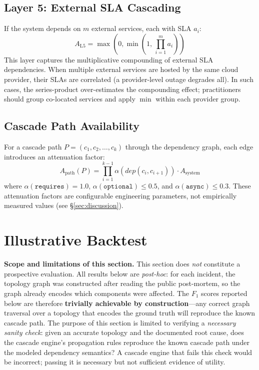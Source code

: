 \documentclass[10pt,twocolumn]{article}
\begin{document}
\subsection{Layer 5: External SLA Cascading}
If the system depends on $m$ external services, each with SLA $a_i$:
\begin{equation}
  A_{\text{L5}} = \max\!\left(0, \min\!\left(1,\,\prod_{i=1}^{m} a_i\right)\right)
\end{equation}
This layer captures the multiplicative compounding of external SLA
dependencies.
When multiple external services are hosted by the same cloud
provider, their SLAs are correlated (a provider-level outage
degrades all). In such cases, the series-product over-estimates
the compounding effect; practitioners should group co-located
services and apply $\min$ within each provider group.

\subsection{Cascade Path Availability}
For a cascade path $P = (c_1, c_2, \ldots, c_k)$ through the
dependency graph, each edge introduces an attenuation factor:
\begin{equation}
  A_{\text{path}}(P) = \prod_{i=1}^{k-1} \alpha(\mathit{dep}(c_i, c_{i+1}))
    \cdot A_{\text{system}}
\end{equation}
where $\alpha(\texttt{requires}) = 1.0$,
$\alpha(\texttt{optional}) \le 0.5$, and
$\alpha(\texttt{async}) \le 0.3$.
These attenuation factors are configurable engineering parameters,
not empirically measured values (see \S\ref{sec:discussion}).
\section{Illustrative Backtest}\label{sec:eval}

\textbf{Scope and limitations of this section.}
This section does \emph{not} constitute a prospective evaluation.
All results below are \emph{post-hoc}: for each incident, the
topology graph was constructed after reading the public
post-mortem, so the graph already encodes which components were
affected. The $F_1$ scores reported below are therefore
\textbf{trivially achievable by construction}---any correct
graph traversal over a topology that encodes the ground truth
will reproduce the known cascade path. The purpose of this
section is limited to verifying a \emph{necessary sanity check}:
given an accurate topology and the documented root cause, does
the cascade engine's propagation rules reproduce the known
cascade path under the modeled dependency semantics? A cascade
engine that fails this check would be incorrect; passing it is
necessary but not sufficient evidence of utility.
\end{document}
